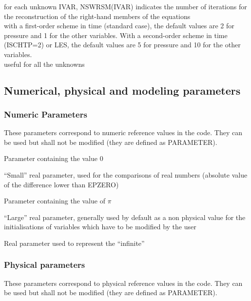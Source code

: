 {for each unknown IVAR, NSWRSM(IVAR) indicates the number of iterations for the
reconstruction of the right-hand members of the equations\\ 
with a first-order scheme in time
(standard case), the default values are 2 for pressure and 1 for the
other variables. With a second-order scheme in time (ISCHTP=2) or LES, the
default values are 5 for pressure and 10 for the other variables.\\
useful for all the unknowns}


\subsection{Numerical, physical and modeling parameters}
\subsubsection{Numeric Parameters}

These parameters correspond to numeric reference values in the code.
They can be used but shall not be modified (they are defined as PARAMETER).

{Parameter containing the value 0}

{``Small'' real parameter, used for the comparisons of real numbers (absolute
value of the difference lower than EPZERO)}

{Parameter containing the value of $\pi$}
 
{``Large'' real parameter, generally used by default as a non physical value for
the initialisations of variables which have to be modified by the user}

{Real parameter used to represent the ``infinite''}

\subsubsection{Physical parameters}
These parameters correspond to physical reference values in the code.
They can be used but shall not be modified (they are defined as PARAMETER).

